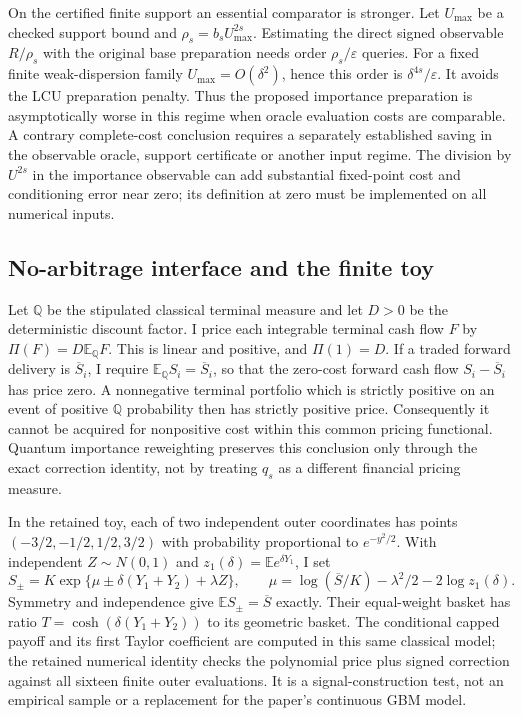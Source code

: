 On the certified finite support an essential comparator is stronger.
Let $U_{\max}$ be a checked support bound and
$\rho_s=b_sU_{\max}^{2s}$. Estimating the direct signed observable
$R/\rho_s$ with the original base preparation needs order
$\rho_s/\varepsilon$ queries. For a fixed finite weak-dispersion
family $U_{\max}=O(\delta^2)$, hence this order is
$\delta^{4s}/\varepsilon$. It avoids the LCU preparation penalty.
Thus the proposed importance preparation is asymptotically worse in
this regime when oracle evaluation costs are comparable. A contrary
complete-cost conclusion requires a separately established saving in
the observable oracle, support certificate or another input regime.
The division by $U^{2s}$ in the importance observable can add substantial
fixed-point cost and conditioning error near zero; its definition at
zero must be implemented on all numerical inputs.

\subsection{No-arbitrage interface and the finite toy}

Let $\mathbb Q$ be the stipulated classical terminal measure and let
$D>0$ be the deterministic discount factor. I price each integrable
terminal cash flow $F$ by $\Pi(F)=D\mathbb E_{\mathbb Q}F$.
This is linear and positive, and $\Pi(1)=D$. If a traded forward
delivery is $\overline S_i$, I require
$\mathbb E_{\mathbb Q}S_i=\overline S_i$, so that the zero-cost
forward cash flow $S_i-\overline S_i$ has price zero. A nonnegative
terminal portfolio which is strictly positive on an event of positive
$\mathbb Q$ probability then has strictly positive price. Consequently
it cannot be acquired for nonpositive cost within this common pricing
functional. Quantum importance reweighting preserves this conclusion
only through the exact correction identity, not by treating $q_s$ as
a different financial pricing measure.

In the retained toy, each of two independent outer coordinates has
points $(-3/2,-1/2,1/2,3/2)$ with probability proportional to
$e^{-y^2/2}$. With independent $Z\sim N(0,1)$ and
$z_1(\delta)=\mathbb E e^{\delta Y_1}$, I set
\[
 S_\pm=K\exp\{\mu\pm\delta(Y_1+Y_2)+\lambda Z\},\qquad
 \mu=\log(\overline S/K)-\lambda^2/2-2\log z_1(\delta).
\]
Symmetry and independence give
$\mathbb E S_\pm=\overline S$ exactly. Their equal-weight basket
has ratio $T=\cosh(\delta(Y_1+Y_2))$ to its geometric basket.
The conditional capped payoff and its first Taylor coefficient are
computed in this same classical model; the retained numerical identity
checks the polynomial price plus signed correction against all sixteen
finite outer evaluations. It is a signal-construction test, not an
empirical sample or a replacement for the paper's continuous GBM model.

